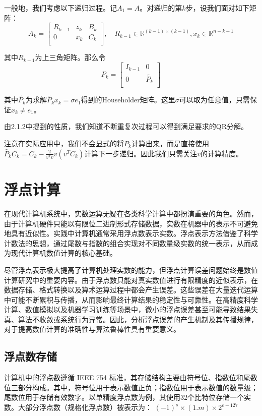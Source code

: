 \documentclass[UTF8,a4paper,openany]{ctexbook}
\begin{document}
一般地，我们考虑以下递归过程。记$A_1=A$。对递归的第$k$步，设我们面对如下矩阵：
$$A_k=\left[\begin{matrix}R_{k-1}&z_k&B_k\\0&x_k&C_k\\\end{matrix}\right],\quad R_{k-1}\in\mathbb{R}^{(k-1)\times(k-1)},x_k\in\mathbb{R}^{n-k+1}$$

其中$R_{k-1}$为上三角矩阵。那么令
$$P_k=\left[\begin{matrix}I_{k-1}&0\\0&\widetilde{P_k}\\\end{matrix}\right]$$

其中$\widetilde{P_k}$为求解$\widetilde{P_k}x_k=\sigma e_1$得到的Householder矩阵。这里$\sigma$可以取为任意值，只需保证$x_k\neq e_1$。

由2.1.2中提到的性质，我们知道不断重复次过程可以得到满足要求的QR分解。

注意在实际应用中，我们不会显式的将$P_k$计算出来，而是直接使用$\widetilde{P_k}C_k=C_k-\frac{2}{v^Tv}v(v^TC_k)$计算下一步递归。因此我们只需关注$v$的计算精度。

\section{浮点计算}

在现代计算机系统中，实数运算无疑在各类科学计算中都扮演重要的角色。然而，由于计算机硬件只能以有限位二进制形式存储数据，实数在机器中的表示不可避免地具有近似性。实践中计算机通常采用浮点数表示实数。浮点表示方法借鉴了科学计数法的思想，通过尾数与指数的组合实现对不同数量级实数的统一表示，从而成为现代计算机数值计算的核心基础。

尽管浮点表示极大提高了计算机处理实数的能力，但浮点计算误差问题始终是数值计算研究中的重要内容。由于浮点数只能对真实数值进行有限精度的近似表示，在数据存储、格式转换以及算术运算过程中都会产生误差。这些误差在大量迭代运算中可能不断累积与传播，从而影响最终计算结果的稳定性与可靠性。在高精度科学计算、数值模拟以及机器学习训练等场景中，微小的浮点误差甚至可能导致结果失真、算法不收敛或系统行为异常。因此，分析浮点误差的产生机制及其传播规律，对于提高数值计算的准确性与算法鲁棒性具有重要意义。

\subsection{浮点数存储}

计算机中的浮点数遵循 IEEE 754 标准，其存储结构主要由符号位、指数位和尾数位三部分构成。其中，符号位用于表示数值正负；指数位用于表示数值的数量级；尾数位用于存储有效数字。以单精度浮点数为例，其使用32个比特位存储一个实数。大部分浮点数（规格化浮点数）被表示为：
$(-1)^s\times(1.m)\times2^{e-127}$
\end{document}
